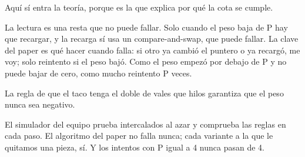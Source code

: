 Aquí sí entra la teoría, porque es la que explica por qué la cota se cumple.

La lectura es una resta que no puede fallar. Solo cuando el peso baja de P hay que recargar, y la recarga sí usa un compare-and-swap, que puede fallar. La clave del paper es qué hacer cuando falla: si otro ya cambió el puntero o ya recargó, me voy; solo reintento si el peso bajó. Como el peso empezó por debajo de P y no puede bajar de cero, como mucho reintento P veces.

La regla de que el taco tenga el doble de vales que hilos garantiza que el peso nunca sea negativo.

El simulador del equipo prueba intercalados al azar y comprueba las reglas en cada paso. El algoritmo del paper no falla nunca; cada variante a la que le quitamos una pieza, sí. Y los intentos con P igual a 4 nunca pasan de 4.
